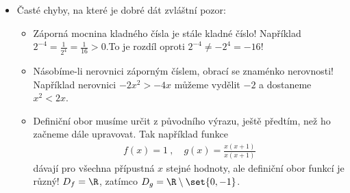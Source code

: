 \begin{itemize}
    \item Časté chyby, na které je dobré dát zvláštní pozor:
    \begin{itemize}
        \item Záporná mocnina kladného čísla je stále kladné číslo! Například $2^{-4} = \frac{1}{2^4} = \frac{1}{16} > 0$.\newline To je rozdíl oproti $2^{-4} \neq -2^4 = -16$!
        \item Násobíme-li nerovnici záporným číslem, obrací se znaménko nerovnosti! Například nerovnici $-2x^2 > -4x$ můžeme vydělit $-2$ a dostaneme $x^2 < 2x$.
        \item Definiční obor musíme určit z původního výrazu, ještě předtím, než ho začneme dále upravovat. Tak například funkce \begin{align}
            f(x) = 1 \:, \quad g(x) = \frac{x(x+1)}{x(x+1)}
        \end{align}
        dávají pro všechna přípustná $x$ stejné hodnoty, ale definiční obor funkcí je různý! \newline $D_f = \R$, zatímco $D_g = \R \setminus \set{0,-1}$.
    \end{itemize}

\end{itemize}
